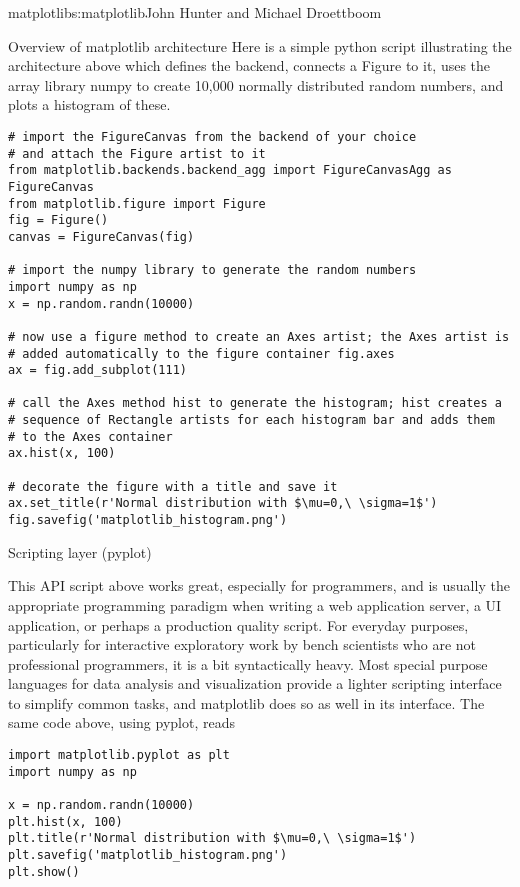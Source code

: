 \begin{aosachapter}{matplotlib}{s:matplotlib}{John Hunter and Michael Droettboom}
\begin{aosasect1}{Overview of matplotlib architecture}
Here is a simple python script illustrating the architecture above
which defines the backend, connects a Figure to it, uses the array
library numpy to create 10,000 normally distributed random numbers,
and plots a histogram of these.

\begin{verbatim}
# import the FigureCanvas from the backend of your choice
# and attach the Figure artist to it
from matplotlib.backends.backend_agg import FigureCanvasAgg as FigureCanvas
from matplotlib.figure import Figure
fig = Figure()
canvas = FigureCanvas(fig)

# import the numpy library to generate the random numbers
import numpy as np
x = np.random.randn(10000)

# now use a figure method to create an Axes artist; the Axes artist is
# added automatically to the figure container fig.axes
ax = fig.add_subplot(111)

# call the Axes method hist to generate the histogram; hist creates a
# sequence of Rectangle artists for each histogram bar and adds them
# to the Axes container
ax.hist(x, 100)

# decorate the figure with a title and save it
ax.set_title(r'Normal distribution with $\mu=0,\ \sigma=1$')
fig.savefig('matplotlib_histogram.png')
\end{verbatim}

\begin{aosasect2}{Scripting layer (pyplot)}


This API script above works great, especially for programmers, and is
usually the appropriate programming paradigm when writing a web
application server, a UI application, or perhaps a production quality
script.  For everyday purposes, particularly for interactive
exploratory work by bench scientists who are not professional
programmers, it is a bit syntactically heavy.  Most special purpose
languages for data analysis and visualization provide a lighter
scripting interface to simplify common tasks, and matplotlib does so
as well in its  interface.  The same code
above, using pyplot, reads

\begin{verbatim}
import matplotlib.pyplot as plt
import numpy as np

x = np.random.randn(10000)
plt.hist(x, 100)
plt.title(r'Normal distribution with $\mu=0,\ \sigma=1$')
plt.savefig('matplotlib_histogram.png')
plt.show()
\end{verbatim}


\end{aosasect2}
\end{aosasect1}
\end{aosachapter}
